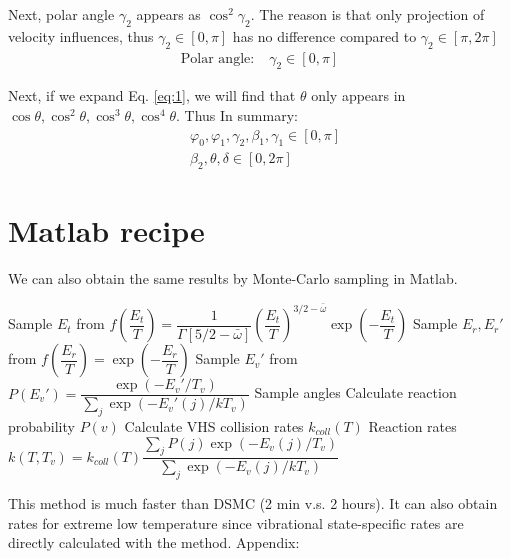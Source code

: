 \documentclass[11pt,letterpaper]{article}
\renewcommand{\phi}{\varphi}
\begin{document}
Next, polar angle $ \gamma_2 $ appears as $ \cos^2\gamma_2 $. The reason is that only projection of velocity influences, thus $ \gamma_2 \in [0,\pi] $ has no difference compared to  $ \gamma_2 \in [\pi,2\pi] $
\begin{align}
\text{Polar angle}:&\; \gamma_2\in [0,\pi]  
\end{align}

Next, if we expand Eq. \ref{eq:1}, we will find that $ \theta $ only appears in $ \cos \theta, \cos^2 \theta, \cos^3 \theta, \cos^4 \theta $. Thus
In summary:
\begin{equation}
\boxed{
\begin{aligned}
& \phi_0, \phi_1, \gamma_2, \beta_1, \gamma_1 \in [0,\pi]  \\
& \beta_2, \theta, \delta \in [0,2\pi]  
\end{aligned}}
\end{equation}

\section{Matlab recipe}
We can also obtain the same results by Monte-Carlo sampling in Matlab. 
\newpage
\begin{algorithm}
	\begin{algorithmic}[1]
		    \State Sample $ E_t $ from $ f(\dfrac{E_t}{T}) =\dfrac{1}{\Gamma[5/2-\bar{\omega}]} \left(\dfrac{E_t}{T}\right)^{3/2-\bar{\omega}} \exp(-\dfrac{E_t}{T})  $
		    \State Sample $ E_r,E_r' $ from $ f(\dfrac{E_r}{T}) = \exp(-\dfrac{E_r}{T}) $
		    \State Sample $E_v'$ from $ P(E_v') = \dfrac{\exp(-E_v'/T_v)}{\sum_{j} \exp(-E_v'(j)/kT_v)} $
		    \State Sample angles
		    \State Calculate reaction probability $ P(v) $
		\EndFor
		\State Calculate VHS collision rates $ k_{coll}(T) $
		\State Reaction rates $ k(T,T_v) = k_{coll}(T) \dfrac{\sum_{j}P(j)\exp(-E_v(j)/T_v) }{\sum_{j} \exp(-E_v(j)/kT_v)} $
	\end{algorithmic}
\end{algorithm}

This method is much faster than DSMC (2 min v.s. 2 hours). It can also obtain rates for extreme low temperature since vibrational state-specific rates are directly calculated with the method. 
 \newpage
Appendix:
\end{document}
